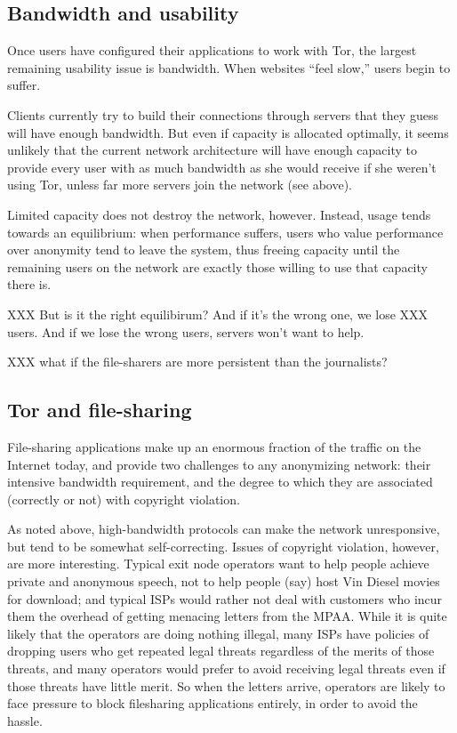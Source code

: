 \documentclass{llncs}
\begin{document}
\subsection{Bandwidth and usability}
\label{subsec:bandwidth-and-usability}
Once users have configured their applications to work with Tor, the largest
remaining usability issue is bandwidth.  When websites ``feel slow,'' users
begin to suffer.

Clients currently try to build their connections through servers that they
guess will have enough bandwidth.  But even if capacity is allocated
optimally, it seems unlikely that the current network architecture will have
enough capacity to provide every user with as much bandwidth as she would
receive if she weren't using Tor, unless far more servers join the network
(see above).

Limited capacity does not destroy the network, however.  Instead, usage tends
towards an equilibrium: when performance suffers, users who value performance
over anonymity tend to leave the system, thus freeing capacity until the
remaining users on the network are exactly those willing to use that capacity
there is.

XXX But is it the right equilibirum?  And if it's the wrong one, we lose
XXX users.  And if we lose the wrong users, servers won't want to help.

XXX what if the file-sharers are more persistent than the journalists?

\subsection{Tor and file-sharing}
File-sharing applications make up an enormous
fraction of the traffic on the Internet today, and provide two challenges to
any anonymizing network: their intensive bandwidth requirement, and the
degree to which they are associated (correctly or not) with copyright
violation.

As noted above, high-bandwidth protocols can make the network unresponsive,
but tend to be somewhat self-correcting.  Issues of copyright violation,
however, are more interesting.  Typical exit node operators want to help
people achieve private and anonymous speech, not to help people (say) host
Vin Diesel movies for download; and typical ISPs would rather not
deal with customers who incur them the overhead of getting menacing letters
from the MPAA.  While it is quite likely that the operators are doing nothing
illegal, many ISPs have policies of dropping users who get repeated legal
threats regardless of the merits of those threats, and many operators would
prefer to avoid receiving legal threats even if those threats have little
merit.  So when the letters arrive, operators are likely to face
pressure to block filesharing applications entirely, in order to avoid the
hassle.
\end{document}
